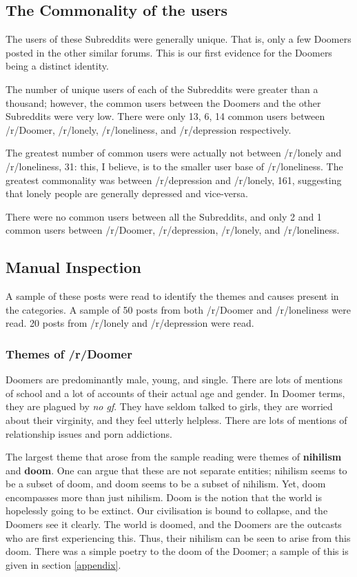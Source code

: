 \documentclass[../report.tex]{subfiles}
\begin{document}
\subsection{The Commonality of the users}
The users of these Subreddits were generally unique.
That is, only a few Doomers posted in the other similar forums. 
This is our first evidence for the Doomers being a distinct identity. 

The number of unique users of each of the Subreddits were greater than a thousand; however, the common users between the Doomers and the other Subreddits were very low. 
There were only 13, 6, 14 common users between /r/Doomer, /r/lonely, /r/loneliness, and /r/depression respectively. 

The greatest number of common users were actually not between /r/lonely and /r/loneliness, 31: this, I believe, is to the smaller user base of /r/loneliness. 
The greatest commonality was between /r/depression and /r/lonely, 161, suggesting that lonely people are generally depressed and vice-versa.

There were no common users between all the Subreddits, and only 2 and 1 common users between /r/Doomer, /r/depression, /r/lonely, and /r/loneliness.

\subsection{Manual Inspection}
A sample of these posts were read to identify the themes and causes present in the categories.
A sample of 50 posts from both /r/Doomer and /r/loneliness were read. 20 posts from /r/lonely and /r/depression were read. 

\subsubsection{Themes of /r/Doomer}
Doomers are predominantly male, young, and single. 
There are lots of mentions of school and a lot of accounts of their actual age and gender. 
In Doomer terms, they are plagued by \textit{no gf}. 
They have seldom talked to girls, they are worried about their virginity, and they feel utterly helpless. 
There are lots of mentions of relationship issues and porn addictions. 

The largest theme that arose from the sample reading were themes of \textbf{nihilism} and \textbf{doom}. 
One can argue that these are not separate entities; nihilism seems to be a subset of doom, and doom seems to be a subset of nihilism.
Yet, doom encompasses more than just nihilism.
Doom is the notion that the world is hopelessly going to be extinct. 
Our civilisation is bound to collapse, and the Doomers see it clearly.
The world is doomed, and the Doomers are the outcasts who are first experiencing this. 
Thus, their nihilism can be seen to arise from this doom. 
There was a simple poetry to the doom of the Doomer; a sample of this is given in section \ref{appendix}.
\end{document}

